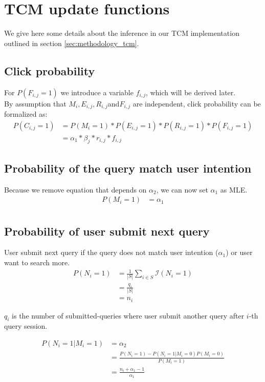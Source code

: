 \section{TCM update functions}
\label{app:tcm_eq}
We give here some details about the inference in our TCM implementation outlined in section \ref{sec:methodology_tcm}.

\subsection{Click probability}
For $P(F_{i,j}=1)$ we introduce a variable $f_{i,j}$, which will be derived later. \\
By assumption that $M_i, E_{i,j},R_{i,j}$and$F_{i,j}$ are independent, click probability can be formalized as:
\begin{align}
P(C_{i,j} = 1)
&= P(M_i=1) * P(E_{i,j}=1) * P(R_{i,j}=1) * P(F_{i,j} = 1) \nonumber\\
&= \alpha_1 * \beta_j * r_{i,j} * f_{i,j}
\label{eq:proba_click}
\end{align}

\subsection{Probability of the query match user intention}
Because we remove equation that depends on $\alpha_2$, we can now set $\alpha_1$ as MLE.
\begin{align*}
P(M_i = 1) 
&= \alpha_1 \\
\end{align*}

\subsection{Probability of user submit next query}
User submit next query if the query does not match user intention ($\alpha_1$) or user want to search more.
\begin{align*}
P(N_i=1) 
&= \frac{1}{|S|} \sum_{i\in S} \mathcal{I}(N_i=1) \\
&= \frac{q_i}{|S|} \\
&= n_i
\end{align*}

$q_i$ is the number of submitted-queries where user submit another query after $i$-th query session.

\begin{align*}
P(N_i=1|M_i=1) 
&= \alpha_2 \\
&= \frac{P(N_i=1) - P(N_i=1|M_i=0)P(M_i=0)}{P(M_i=1)} \\
&= \frac{n_i + \alpha_1 - 1}{\alpha_1}
\end{align*}

